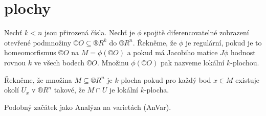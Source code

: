\documentclass[12pt]{article}                   %
\begin{document}
\section{plochy}
    \begin{definice}
        Nechť $k < n$ jsou přirozená čísla. Nechť je $\phi$ spojitě diferencovatelné zobrazení otevřené podmnožiny $©O \subseteq ®R^k$ do $®R^n$. Řekněme, že $\phi$ je regulární, pokud je to homeomorfismus $©O$ na $M = \phi(©O)$ a pokud má Jacobiho matice $J\phi$ hodnost rovnou $k$ ve všech bodech $©O$. Množinu $\phi(©O)$ pak nazveme lokální $k$-plochou.

        Řekněme, že množina $M \subseteq ®R^n$ je $k$-plocha pokud pro každý bod $x \in M$ existuje okolí $U_x$ v $®R^n$ takové, že $M \cap U$ je lokální $k$-plocha.
    \end{definice}

    Podobný začátek jako Analýza na varietách (AnVar).
\end{document}
